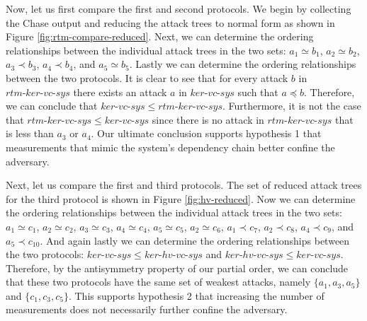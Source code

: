 \documentclass[runningheads]{llncs}
\theoremstyle{definition}
\begin{document}
Now, let us first compare the first and second protocols. We begin by collecting the Chase output and reducing the attack trees to normal form as shown in Figure \ref{fig:rtm-compare-reduced}. Next, we can determine the ordering relationships between the individual attack trees in the two sets: $a_1 \simeq b_1$, $a_2 \simeq b_2$, $a_3 \prec b_3$, $a_4 \prec b_4$, and $a_5 \simeq b_5$. Lastly we can determine the ordering relationships between the two protocols. It is clear to see that for every attack $b$ in $rtm\text{-}ker\text{-}vc\text{-}sys$ there exists an attack $a$ in $ker\text{-}vc\text{-}sys$ such that $a \preceq b$. Therefore, we can conclude that $ker\text{-}vc\text{-}sys \leq rtm\text{-}ker\text{-}vc\text{-}sys$. Furthermore, it is not the case that $rtm\text{-}ker\text{-}vc\text{-}sys \leq ker\text{-}vc\text{-}sys$ since there is no attack in $rtm\text{-}ker\text{-}vc\text{-}sys$ that is less than $a_3$ or $a_4$. Our ultimate conclusion supports hypothesis 1 that measurements that mimic the system's dependency chain better confine the adversary.

Next, let us compare the first and third protocols. The set of reduced attack trees for the third protocol is shown in Figure \ref{fig:hv-reduced}. Now we can determine the ordering relationships between the individual attack trees in the two sets: $a_1 \simeq c_1$, $a_2 \simeq c_2$, $a_3 \simeq c_3$, $a_4 \simeq c_4$, $a_5 \simeq c_5$, $a_2 \simeq c_6$, $a_1 \prec c_7$, $a_2 \prec c_8$, $a_4 \prec c_9$, and $a_5 \prec c_{10}$. And again lastly we can determine the ordering relationships between the two protocols: $ker\text{-}vc\text{-}sys \leq ker\text{-}hv\text{-}vc\text{-}sys$ and $ker\text{-}hv\text{-}vc\text{-}sys \leq ker\text{-}vc\text{-}sys$. Therefore, by the antisymmetry property of our partial order, we can conclude that these two protocols have the same set of weakest attacks, namely $\{a_1, a_3, a_5\}$ and $\{c_1, c_3, c_5\}$. This supports hypothesis 2 that increasing the number of measurements does not necessarily further confine the adversary.
\end{document}
